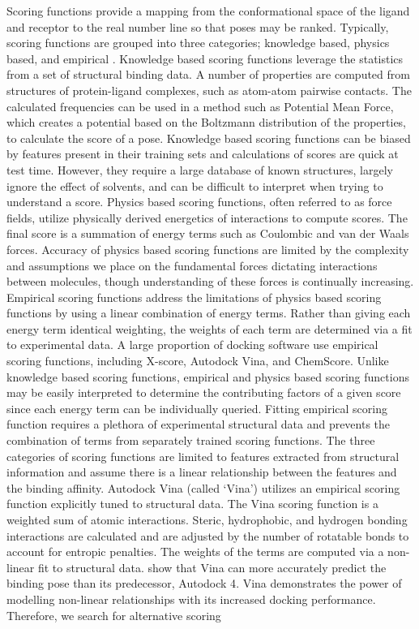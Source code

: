 \documentclass[journal=jcisd8,manuscript=article]{achemso}
\begin{document}
Scoring functions provide a mapping from the conformational space of the ligand and receptor to the real number line so that poses may be ranked. Typically, scoring functions are grouped into three categories; knowledge based, physics based, and empirical \cite{kitchen2004docking}. Knowledge based scoring functions leverage the statistics from a set of structural binding data. A number of properties are computed from structures of protein-ligand complexes, such as atom-atom pairwise contacts. The calculated frequencies can be used in a method such as Potential Mean Force, which creates a potential based on the Boltzmann distribution of the properties, to calculate the score of a pose. Knowledge based scoring functions can be biased by features present in their training sets and calculations of scores are quick at test time\cite{kitchen2004docking}. However, they require a large database of known structures, largely ignore the effect of solvents, and can be difficult to interpret when trying to understand a score\cite{brooijmans2003molecular}. Physics based scoring functions, often referred to as force fields, utilize physically derived energetics of interactions to compute scores. The final score is a summation of energy terms such as Coulombic and van der Waals forces\cite{huang2006molecular}. Accuracy of physics based scoring functions are limited by the complexity and assumptions we place on the fundamental forces dictating interactions between molecules, though understanding of these forces is continually increasing\cite{liu2015classification}. Empirical scoring functions address the limitations of physics based scoring functions by using a linear combination of energy terms. Rather than giving each energy term identical weighting, the weights of each term are determined via a fit to experimental data. A large proportion of docking software use empirical scoring functions, including X-score, Autodock Vina, and ChemScore\cite{wang2002further,trott2010autodock,eldridge1997empirical}. Unlike knowledge based scoring functions, empirical and physics based scoring functions may be easily interpreted to determine the contributing factors of a given score since each energy term can be individually queried. Fitting empirical scoring function requires a plethora of experimental structural data and prevents the combination of terms from separately trained scoring functions. The three categories of scoring functions are limited to features extracted from structural information and assume there is a linear relationship between the features and the binding affinity. Autodock Vina (called `Vina') utilizes an empirical scoring function explicitly tuned to structural data\cite{trott2010autodock}. The Vina scoring function is a weighted sum of atomic interactions.  Steric, hydrophobic, and hydrogen bonding interactions are calculated and are adjusted by the number of rotatable bonds to account for entropic penalties. The weights of the terms are computed via a non-linear fit to structural data. \citet{nguyen2019autodock} show that Vina can more accurately predict the binding pose than its predecessor, Autodock 4\cite{morris1998automated}. Vina demonstrates the power of modelling non-linear relationships with its increased docking performance. Therefore, we search for alternative scoring 
\end{document}
